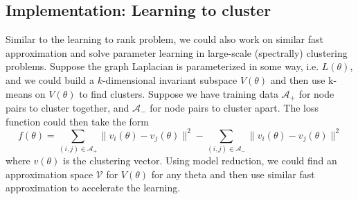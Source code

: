 \documentclass[a4paper, 11pt]{article}
\begin{document}
\subsection{Implementation: Learning to cluster}
Similar to the learning to rank problem, we could also work on similar fast approximation and solve parameter learning in large-scale (spectrally) clustering problems. Suppose the graph Laplacian is parameterized in some way, i.e. $L(\theta)$, and we could build a $k$-dimensional invariant subspace $V(\theta)$ and then use k-means on $V(\theta)$ to find clusters. Suppose we have training data $\mathcal{A}_+$ for node pairs to cluster together, and  $\mathcal{A}_-$ for node pairs to cluster apart. The loss function could then take the form 
\begin{equation}
	f(\theta) = \sum_{(i,j)\in \mathcal{A}_+} \|v_i(\theta) - v_j(\theta)\|^2 - \sum_{(i,j)\in \mathcal{A}_-} \|v_i(\theta) - v_j(\theta)\|^2 
\end{equation}
where $v(\theta)$ is the clustering vector. 
Using model reduction, we could find an approximation space $\mathcal{V}$ for $V(\theta)$ for any theta and then use similar fast approximation to accelerate the learning. 



%
%

















\newpage
{\small


}
\end{document}
